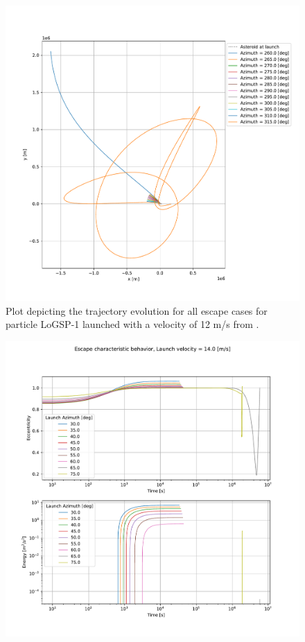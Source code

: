 \documentclass[print]{tudelft-report}
\begin{document}
\begin{appendices}
\begin{figure}[htb]
    \includegraphics[width=\textwidth, height=0.6\textheight, keepaspectratio=true]{Results/Images/leading_edge_perturbations/logsp1_escape_traj_12ms_solarPhase225.pdf}
    \caption{Plot depicting the trajectory evolution for all escape cases for particle LoGSP-1 launched with a velocity of 12 m/s from \protect{}.}
    \label{fig:leadingEdge_logsp1_escape_traj_12ms_solar225}
    \end{figure}
    \FloatBarrier
    \begin{figure}[htb]
    \centering
    \captionsetup{justification=centering}
    \includegraphics[width=\textwidth, height=0.6\textheight, keepaspectratio=true]{Results/Images/leading_edge_perturbations/logsp1_escape_energy_ecc_14ms_solarPhase225.pdf}

\end{figure}
\end{appendices}
\end{document}
